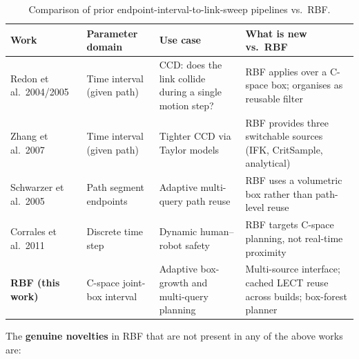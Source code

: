 \documentclass[11pt,a4paper]{article}
\begin{document}
\begin{table}[htbp]
\centering
\caption{Comparison of prior endpoint-interval-to-link-sweep pipelines vs.\ RBF.}
\label{tab:novelty}
\small
\begin{tabular}{@{}p{3.2cm}p{3.0cm}p{3.0cm}p{4.2cm}@{}}
\toprule
\textbf{Work} & \textbf{Parameter domain} & \textbf{Use case} & \textbf{What is new vs.\ RBF} \\
\midrule
Redon et al.\ 2004/2005
  \cite{redon2004continuous_avatar,redon2005fast}
& Time interval (given path)
& CCD: does the link collide during a single motion step?
& RBF applies over a C-space box; organises as reusable filter \\
\addlinespace
Zhang et al.\ 2007
  \cite{zhang2007taylor}
& Time interval (given path)
& Tighter CCD via Taylor models
& RBF provides three switchable sources (IFK, CritSample, analytical) \\
\addlinespace
Schwarzer et al.\ 2005
  \cite{schwarzer2005adaptive}
& Path segment endpoints
& Adaptive multi-query path reuse
& RBF uses a volumetric box rather than path-level reuse \\
\addlinespace
Corrales et al.\ 2011
  \cite{corrales2011dynamic}
& Discrete time step
& Dynamic human--robot safety
& RBF targets C-space planning, not real-time proximity \\
\midrule
\textbf{RBF (this work)}
& C-space joint-box interval
& Adaptive box-growth and multi-query planning
& Multi-source interface; cached LECT reuse across builds; box-forest planner\\
\bottomrule
\end{tabular}
\end{table}

The \textbf{genuine novelties} in RBF that are not present in any of the above works are:
\end{document}
